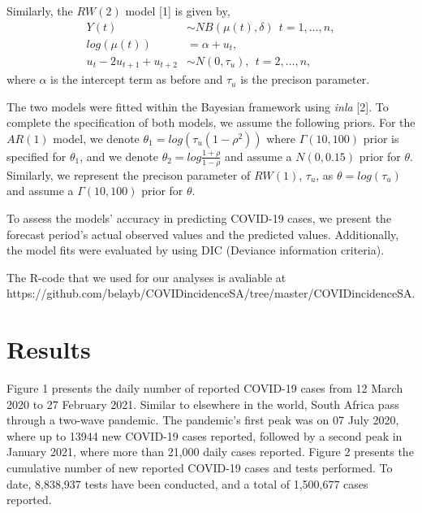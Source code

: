 \documentclass[10pt,letterpaper]{article}
\begin{document}
Similarly, the \(RW(2)\) model {[}1{]} is given by, \[
\begin{aligned}
 Y(t) &\sim NB(\mu(t), \delta) \ \ t=1, \dots, n,\\
 log(\mu(t)) &= \alpha+u_t, \\
 u_t-2u_{t+1}+u_{t+2} &\sim N(0, \tau_u), \ \ t=2, \dots, n,
\end{aligned}
\] where \(\alpha\) is the intercept term as before and \(\tau_u\) is
the precison parameter.

The two models were fitted within the Bayesian framework using
\emph{inla} {[}2{]}. To complete the specification of both models, we
assume the following priors. For the \(AR(1)\) model, we denote
\(\theta_1=log(\tau_u(1-\rho^2))\) where \(\Gamma(10,100)\) prior is
specified for \(\theta_1\), and we denote
\(\theta_2=log\frac{1+\rho}{1-\rho}\) and assume a \(N(0, 0.15)\) prior
for \(\theta\). Similarly, we represent the precison parameter of
\(RW(1)\), \(\tau_u\), as \(\theta=log(\tau_u)\) and assume a
\(\Gamma (10,100)\) prior for \(\theta\).

To assess the models' accuracy in predicting COVID-19 cases, we present
the forecast period's actual observed values and the predicted values.
Additionally, the model fits were evaluated by using DIC (Deviance
information criteria).

The R-code that we used for our analyses is avaliable at
https://github.com/belayb/COVIDincidenceSA/tree/master/COVIDincidenceSA.

\hypertarget{results}{%
\section{Results}\label{results}}

Figure 1 presents the daily number of reported COVID-19 cases from 12
March 2020 to 27 February 2021. Similar to elsewhere in the world, South
Africa pass through a two-wave pandemic. The pandemic's first peak was
on 07 July 2020, where up to 13944 new COVID-19 cases reported, followed
by a second peak in January 2021, where more than 21,000 daily cases
reported. Figure 2 presents the cumulative number of new reported
COVID-19 cases and tests performed. To date, 8,838,937 tests have been
conducted, and a total of 1,500,677 cases reported.
\end{document}
